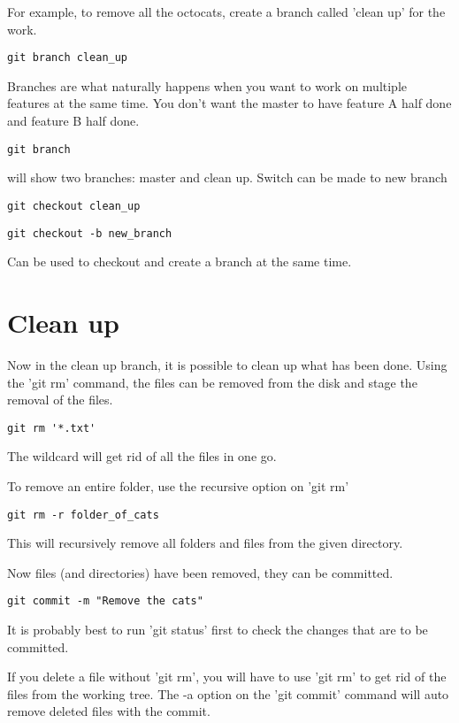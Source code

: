 \documentclass[11pt]{article} %
\begin{document}
For example, to remove all the octocats, create a branch called 'clean up' for the work. 

\begin{lstlisting}
git branch clean_up  
\end{lstlisting}

Branches are what naturally happens when you want to work on multiple features at the same time.  You don't want the master to have feature A half done and feature B half done. 

\begin{lstlisting}
git branch  
\end{lstlisting}
will show two branches:  master and clean up.  Switch can be made to new branch
\begin{lstlisting}
git checkout clean_up  
\end{lstlisting}

\begin{lstlisting}
git checkout -b new_branch 
\end{lstlisting}
Can be used to checkout and create a branch at the same time.  

\section{Clean up}
Now in the clean up branch, it is possible to clean up what has been done. Using the 'git rm' command, the files can be removed from the disk and stage the removal of the files. 

\begin{lstlisting}
git rm '*.txt' 
\end{lstlisting}
The wildcard will get rid of all the files in one go. 

To remove an entire folder, use the recursive option on 'git rm'
\begin{lstlisting}
git rm -r folder_of_cats
\end{lstlisting}

This will recursively remove all folders and files from the given directory.

Now files (and directories) have been removed, they can be committed. 

\begin{lstlisting}
git commit -m "Remove the cats"  
\end{lstlisting}
 It is probably best to run 'git status' first to check the changes that are to be committed.  

If you delete a file without 'git rm', you will have to use 'git rm' to get rid of the files from the working tree.  The -a option on the 'git commit' command will auto remove deleted files with the commit. 
\end{document}
